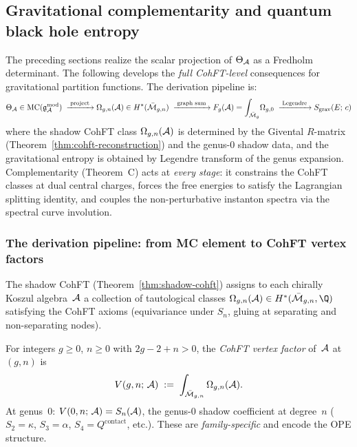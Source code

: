%
%

\subsection{Gravitational complementarity and quantum
black hole entropy}
\label{subsec:thqg-X-gravitational-complementarity}
%
%
%
%

The preceding sections realize the scalar projection of
$\Theta_{\mathcal{A}}$ as a Fredholm determinant. The following develops
the \emph{full CohFT-level} consequences for gravitational
partition functions. The derivation pipeline is:
\[
\Theta_{\mathcal{A}} \in \mathrm{MC}(\mathfrak{g}_{\mathcal{A}}^{\mathrm{mod}})
\;\xrightarrow{\;\text{project}\;}
\Omega_{g,n}(\mathcal{A}) \in H^*(\bar{\mathcal{M}}_{g,n})
\;\xrightarrow{\;\text{graph sum}\;}
F_g(\mathcal{A}) = \int_{\bar{\mathcal{M}}_g}\!\Omega_{g,0}
\;\xrightarrow{\;\text{Legendre}\;}
S_{\mathrm{grav}}(E;\,c)
\]
where the shadow CohFT class $\Omega_{g,n}(\mathcal{A})$
is determined by the Givental $R$-matrix
(Theorem~\ref{thm:cohft-reconstruction}) and
the genus-$0$ shadow data, and the gravitational
entropy is obtained by Legendre transform of the
genus expansion. Complementarity (Theorem~C) acts
at \emph{every stage}: it constrains the CohFT classes
at dual central charges, forces the free energies to
satisfy the Lagrangian splitting identity, and couples
the non-perturbative instanton spectra via the spectral
curve involution.

\subsubsection{The derivation pipeline:
from MC element to CohFT vertex factors}
\label{subsubsec:derivation-pipeline}

The shadow CohFT (Theorem~\ref{thm:shadow-cohft}) assigns
to each chirally Koszul algebra~$\mathcal{A}$ a collection of
tautological classes
$\Omega_{g,n}(\cA) \in H^*(\bar{\cM}_{g,n},\Q)$
satisfying the CohFT axioms (equivariance under $S_n$,
gluing at separating and non-separating nodes).

\begin{definition}%
\label{def:cohft-vertex-factor}%
%
For integers $g \geq 0$, $n \geq 0$ with $2g-2+n > 0$,
the \emph{CohFT vertex factor} of~$\mathcal{A}$ at $(g,n)$ is
\begin{equation}\label{eq:cohft-vertex-def}
V(g,n;\,\mathcal{A})
\;:=\;
\int_{\bar{\mathcal{M}}_{g,n}}
\Omega_{g,n}(\mathcal{A}).
\end{equation}
At genus~$0$: $V(0,n;\,\mathcal{A}) = S_n(\mathcal{A})$, the genus-$0$
shadow coefficient at degree~$n$
($S_2 = \kappa$, $S_3 = \alpha$, $S_4 = Q^{\mathrm{contact}}$, etc.).
These are \emph{family-specific} and encode the OPE structure.
\end{definition}

